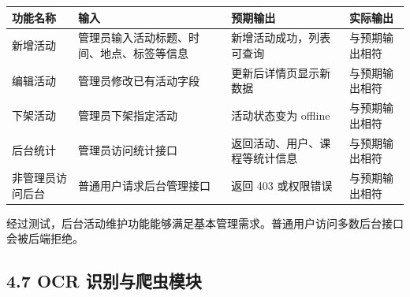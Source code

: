 {\def\LTcaptype{none} %
\begin{longtable}[]{@{}|
  >{\raggedright\arraybackslash}p{}|
  >{\raggedright\arraybackslash}p{}|
  >{\raggedright\arraybackslash}p{}|
  >{\raggedright\arraybackslash}p{}|@{}}
\hline
\rowcolor{gray!12}
\begin{minipage}[b]{\linewidth}\raggedright
\bfseries 功能名称
\end{minipage} & \begin{minipage}[b]{\linewidth}\raggedright
\bfseries 输入
\end{minipage} & \begin{minipage}[b]{\linewidth}\raggedright
\bfseries 预期输出
\end{minipage} & \begin{minipage}[b]{\linewidth}\raggedright
\bfseries 实际输出
\end{minipage} \\
\hline
\endhead
\hline
\endlastfoot
新增活动 & 管理员输入活动标题、时间、地点、标签等信息 &
新增活动成功，列表可查询 & 与预期输出相符 \\
\hline
编辑活动 & 管理员修改已有活动字段 & 更新后详情页显示新数据 &
与预期输出相符 \\
\hline
下架活动 & 管理员下架指定活动 & 活动状态变为 offline & 与预期输出相符 \\
\hline
后台统计 & 管理员访问统计接口 & 返回活动、用户、课程等统计信息 &
与预期输出相符 \\
\hline
非管理员访问后台 & 普通用户请求后台管理接口 & 返回 403 或权限错误 &
与预期输出相符 \\
\hline
\end{longtable}
}

经过测试，后台活动维护功能能够满足基本管理需求。普通用户访问多数后台接口会被后端拒绝。

\subsection{4.7 OCR
识别与爬虫模块}\label{ocr-ux8bc6ux522bux4e0eux722cux866bux6a21ux5757}

